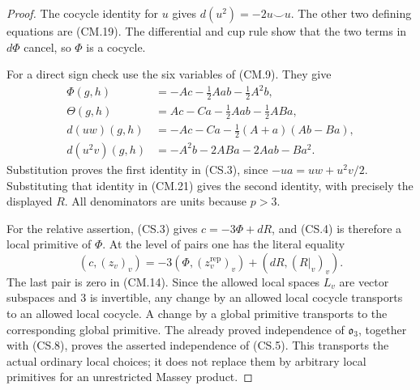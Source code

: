 \documentclass[11pt,a4paper]{article}
\theoremstyle{definition}
\begin{document}
\begin{proof}
The cocycle identity for \(u\) gives
\(d(u^2)=-2u\smile u\).  The other two defining equations
are (CM.19).  The differential and cup rule show that the
two terms in \(d\Phi\) cancel, so \(\Phi\) is a cocycle.

For a direct sign check use the six variables of (CM.9).
They give
\[
\begin{split}
 \Phi(g,h)&=-Ac-\frac12Aab-\frac12A^2b,\\
 \Theta(g,h)&=Ac-Ca-\frac12Aab-\frac12ABa,\\
 d(uw)(g,h)&=-Ac-Ca-\frac12(A+a)(Ab-Ba),\\
 d(u^2v)(g,h)&=-A^2b-2ABa-2Aab-Ba^2.
\end{split}                                                   \tag{CS.7}
\]
Substitution proves the first identity in (CS.3), since
\(-ua=uw+u^2v/2\).  Substituting that identity in (CM.21)
gives the second identity, with precisely the displayed \(R\).
All denominators are units because \(p>3\).

For the relative assertion, (CS.3) gives
\(c=-3\Phi+dR\), and (CS.4) is therefore a local primitive
of \(\Phi\).  At the level of pairs one has the literal equality
\[
 (c,(z_v)_v)=-3(\Phi,(z^{\mathrm{rep}}_v)_v)
                              +(dR,(R|_v)_v).                 \tag{CS.8}
\]
The last pair is zero in (CM.14).  Since the allowed local
spaces \(L_v\) are vector subspaces and \(3\) is invertible,
any change by an allowed local cocycle transports to an
allowed local cocycle.  A change by a global primitive
transports to the corresponding global primitive.
The already proved independence of \(\mathfrak o_3\),
together with (CS.8), proves the asserted independence
of (CS.5).  This transports the actual ordinary local
choices; it does not replace them by arbitrary local
primitives for an unrestricted Massey product.
\end{proof}
\end{document}
